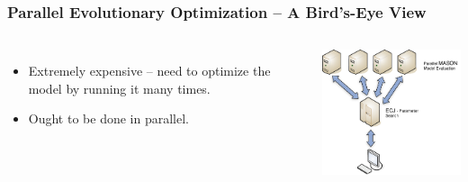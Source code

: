\documentclass{beamer}
\begin{document}
\begin{frame}
	\frametitle{Parallel Evolutionary Optimization -- A Bird's-Eye View}
	\begin{columns}[c]
	\column{2in}
			\begin{itemize}
			\setlength{\itemsep}{20pt}
				\item Extremely expensive -- need to optimize the model by running it many times.
				\item Ought to be done in parallel.	
			\end{itemize}
	\column{3in}
		\centering
		\includegraphics[width=2.5in,keepaspectratio]{master-slave.pdf}	
	\end{columns}
\end{frame}
\end{document}
